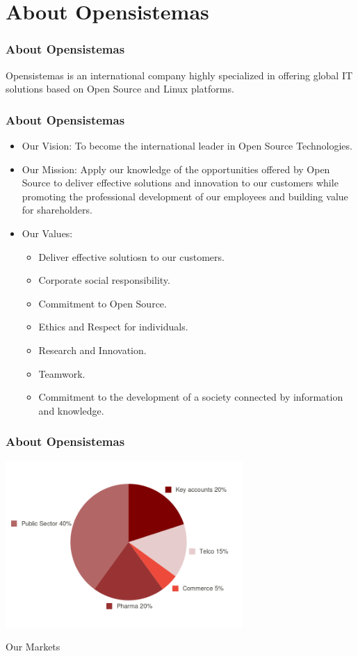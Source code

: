 \documentclass{beamer}
\begin{document}
\section{About Opensistemas}


\begin{frame}
\frametitle{About Opensistemas}
\begin{center}
Opensistemas is an {\LARGE international} company \pause highly {\LARGE specialized} \pause in
offering global {\Huge IT solutions} \pause based on {\Huge Open Source} and {\Huge Linux} platforms.
\end{center}
\end{frame}

\begin{frame}
\frametitle{About Opensistemas}
\begin{itemize}
\item Our Vision:
\pause
To become the international leader in Open Source Technologies.
\pause
\item Our Mission:
\pause
Apply our knowledge of the opportunities offered by Open Source to deliver
effective solutions and innovation to our customers while promoting the
professional development of our employees and building value for 
shareholders.
\pause
\item Our Values:
\pause
\begin{itemize}
\item Deliver effective solutiosn to our customers.
\item Corporate social responsibility.
\item Commitment to Open Source.
\item Ethics and Respect for individuals.
\item Research and Innovation.
\item Teamwork.
\item Commitment to the development of a society connected by information
and knowledge.
\end{itemize}
\end{itemize}
\end{frame}

\begin{frame}
\frametitle{About Opensistemas}
\begin{center}
\includegraphics[width=9cm]{figs/opensistemas-markets}
\end{center}
\begin{center}
Our Markets
\end{center}
\end{frame}
\end{document}
